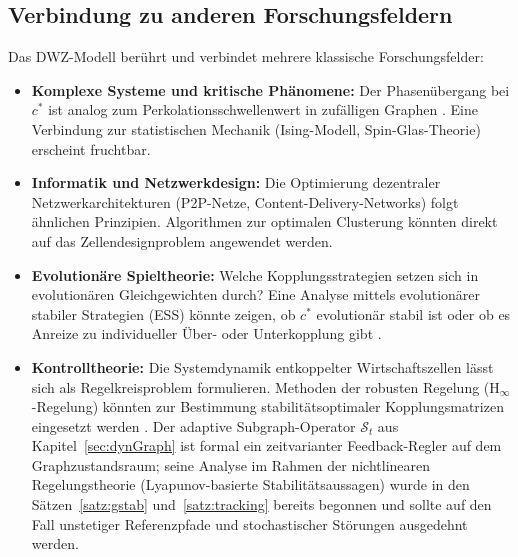﻿\documentclass[a4paper,12pt]{article}
\theoremstyle{definition}
\begin{document}
\subsection{Verbindung zu anderen Forschungsfeldern}

Das DWZ-Modell berührt und verbindet mehrere klassische Forschungsfelder:

\begin{itemize}
    \item \textbf{Komplexe Systeme und kritische Phänomene:} Der Phasenübergang bei $c^*$
          ist analog zum Perkolationsschwellenwert in zufälligen Graphen
          \citep{erdos1960evolution}. Eine Verbindung zur statistischen Mechanik
          (Ising-Modell, Spin-Glas-Theorie) erscheint fruchtbar.

    \item \textbf{Informatik und Netzwerkdesign:} Die Optimierung dezentraler
          Netzwerkarchitekturen (P2P-Netze, Content-Delivery-Networks) folgt ähnlichen
          Prinzipien. Algorithmen zur optimalen Clusterung \citep{luxburg2007spectral}
          könnten direkt auf das Zellendesignproblem angewendet werden.

    \item \textbf{Evolutionäre Spieltheorie:} Welche Kopplungsstrategien setzen sich
          in evolutionären Gleichgewichten durch? Eine Analyse mittels evolutionärer
          stabiler Strategien (ESS) könnte zeigen, ob $c^*$ evolutionär stabil ist
          oder ob es Anreize zu individueller Über- oder Unterkopplung gibt
          \citep{maynardsmith1982evolution}.

    \item \textbf{Kontrolltheorie:} Die Systemdynamik entkoppelter Wirtschaftszellen
          lässt sich als Regelkreisproblem formulieren. Methoden der robusten Regelung
          (H$_\infty$-Regelung) könnten zur Bestimmung stabilitätsoptimaler
          Kopplungsmatrizen eingesetzt werden \citep{zhou1996robust}. Der adaptive
          Subgraph-Operator $\mathcal{S}_t$ aus Kapitel~\ref{sec:dynGraph} ist
          formal ein zeitvarianter Feedback-Regler auf dem Graphzustandsraum;
          seine Analyse im Rahmen der nichtlinearen Regelungstheorie
          (Lyapunov-basierte Stabilitätsaussagen) wurde in den Sätzen~\ref{satz:gstab}
          und~\ref{satz:tracking} bereits begonnen und sollte auf den Fall
          unstetiger Referenzpfade und stochastischer Störungen ausgedehnt werden.


\end{itemize}
\end{document}
